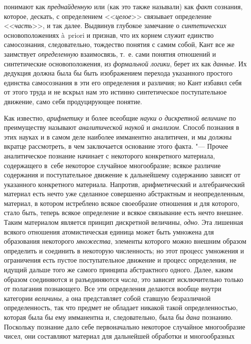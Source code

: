 понимают как {\em преднайденную}
или (как это также называли) как
{\em факт} сознания,
которое, дескать, с определением
<<{\em целое}>> связывает
определение <<{\em часть}>>,
и так далее. Выдвинув глубокое замечание о
{\em синтетических}
основоположениях à~priori и признав, что их корнем служит
единство самосознания, следовательно, тождество понятия с самим собой, Кант
все же заимствует {\em определенную}
взаимосвязь, т.~е. сами понятия отношений и синтетические
основоположения, из {\em формальной
логики}, берет их как
{\em данные}. Их дедукция
должна была бы быть изображением перехода указанного простого единства
самосознания в эти его определения и различия; но Кант избавил себя от
этого труда и не вскрыл нам это истинно синтетическое поступательное
движение, само себя продуцирующее понятие.

Как известно,
{\em арифметику} и более
всеобщие {\em науки}
{\em о дискретной величине}
по преимуществу называют
{\em аналитической наукой}
и {\em анализом}.
Способ познания в этих науках и в самом деле наиболее
имманентно аналитичен, и мы должны вкратце рассмотреть, в чем заключается
основание этого факта. "--- Прочее аналитическое познание
начинает с некоторого конкретного материала, содержащего в~себе некоторое
случайное многообразие; всякое различие содержания и поступательное
движение к дальнейшему содержанию зависят от указанного конкретного
материала. Напротив, арифметический и алгебраический материал есть нечто
уже сделанное совершенно абстрактным и неопределенным, материал, в котором
истреблено всякое своеобразие отношения и для которого, стало быть, теперь
всякое определение и всякое связывание есть нечто внешнее. Таким
материалом является принцип дискретной величины,
{\em одно}. Эта лишенная
всякого отношения атомистическая единица может быть умножена для
образования некоторого {\em множества},
элементы которого можно внешним образом определить и
соединить в некоторую численность; но этот процесс умножения и ограничения
есть пустое поступательное движение и процесс определения, не идущий дальше
того же самого принципа абстрактного одного. Далее, каким образом
соединяются и разъединяются
{\em числа}, это зависит
исключительно только от полагания познающего. Все эти определения делаются
вообще внутри категории {\em величины},
а она представляет собой ставшую безразличной определенность,
так что предмет не обладает никакой такой определенностью, которая была бы
ему имманентна и, следовательно, была бы
{\em дана} познанию.
Поскольку познание дало себе первоначально некоторое случайное многообразие
чисел, они составляют материал для дальнейшей обработки и многообразных
